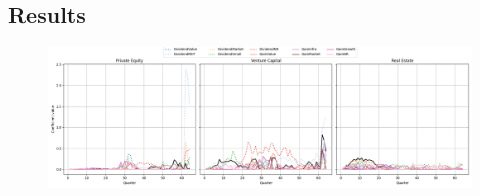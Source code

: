 \documentclass[12pt]{article}
\begin{document}
    \subsection{Results}\label{subsec:results}
    \begin{figure}[h!]
        \label{fig:betas}
        \centering
        \includegraphics[width=0.9\linewidth]{img/img_1}
    \end{figure}
\end{document}
